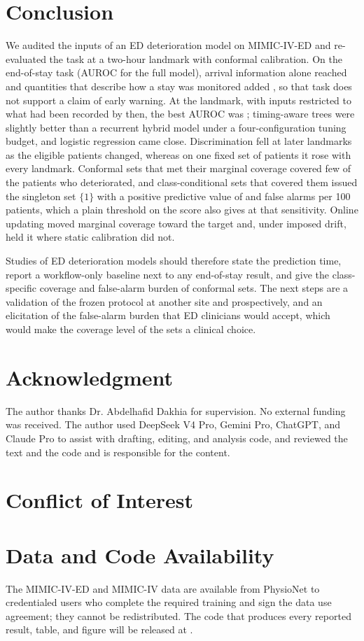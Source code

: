 \section{Conclusion}
\label{sec:conclusion}

We audited the inputs of an ED deterioration model on MIMIC-IV-ED and re-evaluated the task at a two-hour landmark with conformal calibration. On the end-of-stay task (AUROC \RVEosHybridAuroc{} for the full model), arrival information alone reached \RVIncArr{} and quantities that describe how a stay was monitored added \RVIncWorkOverArr{}, so that task does not support a claim of early warning. At the landmark, with inputs restricted to what had been recorded by then, the best AUROC was \RVAurocXgbT{}; timing-aware trees were slightly better than a recurrent hybrid model under a four-configuration tuning budget, and logistic regression came close. Discrimination fell at later landmarks as the eligible patients changed, whereas on one fixed set of patients it rose with every landmark. Conformal sets that met their marginal coverage covered few of the patients who deteriorated, and class-conditional sets that covered them issued the singleton set $\{1\}$ with a positive predictive value of \RVSetPpvMondEci{} and \RVSetFaMondEci{} false alarms per 100 patients, which a plain threshold on the score also gives at that sensitivity. Online updating moved marginal coverage toward the target and, under imposed drift, held it where static calibration did not.

Studies of ED deterioration models should therefore state the prediction time, report a workflow-only baseline next to any end-of-stay result, and give the class-specific coverage and false-alarm burden of conformal sets. The next steps are a validation of the frozen protocol at another site and prospectively, and an elicitation of the false-alarm burden that ED clinicians would accept, which would make the coverage level of the sets a clinical choice.

\section*{Acknowledgment}
The author thanks Dr. Abdelhafid Dakhia for supervision. No external funding was received. The author used DeepSeek V4 Pro, Gemini Pro, ChatGPT, and Claude Pro to assist with drafting, editing, and analysis code, and reviewed the text and the code and is responsible for the content.

\section*{Conflict of Interest}

\section*{Data and Code Availability}
The MIMIC-IV-ED and MIMIC-IV data are available from PhysioNet to credentialed users who complete the
required training and sign the data use agreement; they cannot be redistributed. The code that produces
every reported result, table, and figure will be released at .
